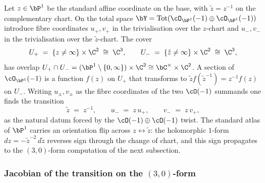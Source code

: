 Let $z \in \bP^1$ be the standard affine coordinate on the base, with
$\tilde z = z^{-1}$ on the complementary chart. On the total space
\(
 \bY = \mathrm{Tot}(\cO_{\bP^1}(-1) \oplus \cO_{\bP^1}(-1))
\)
introduce fibre coordinates $u_+, v_+$ in the trivialisation over the
$z$-chart and $u_-, v_-$ in the trivialisation over the $\tilde z$-chart.
The cover
\[
 U_+ \;=\; \{z \neq \infty\} \times \C^2 \;\cong\; \C^3,
 \qquad
 U_- \;=\; \{\tilde z \neq \infty\} \times \C^2 \;\cong\; \C^3,
\]
has overlap $U_+ \cap U_- = (\bP^1 \setminus \{0, \infty\}) \times \C^2
\cong \bC^\times \times \C^2$. A section of $\cO_{\bP^1}(-1)$ is a function
$f(z)$ on $U_+$ that transforms to $\tilde z f(\tilde z^{-1}) = z^{-1} f(z)$
on $U_-$. Writing $u_\pm, v_\pm$ as the fibre coordinates of the two $\cO(-1)$
summands one finds the transition
\begin{equation}\label{gl:eq:conifold-transition-chart}
 \tilde z \;=\; z^{-1},
 \qquad
 u_- \;=\; z\, u_+,
 \qquad
 v_- \;=\; z\, v_+,
\end{equation}
as the natural datum forced by the $\cO(-1) \oplus \cO(-1)$ twist. The
standard atlas of $\bP^1$ carries an orientation flip across
$z \leftrightarrow \tilde z$: the holomorphic $1$-form $dz = -\tilde z^{-2}\,
d\tilde z$ reverses sign through the change of chart, and this sign
propagates to the $(3,0)$-form computation of the next subsection.

\subsubsection{Jacobian of the transition on the $(3,0)$-form}

